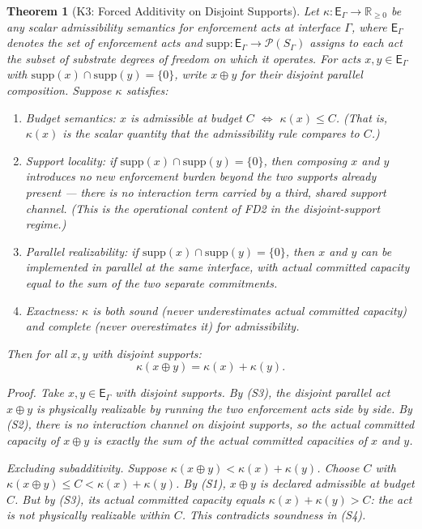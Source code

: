 \documentclass[11pt,a4paper]{article}
\newtheorem{theorem}{Theorem}[section]
\theoremstyle{definition}
\begin{document}
\begin{theorem}[K3: Forced Additivity on Disjoint Supports]\label{thm:K3}
Let $\kappa: \mathsf{E}_\Gamma \to \mathbb{R}_{\ge 0}$ be any scalar admissibility semantics for enforcement acts at interface $\Gamma$, where $\mathsf{E}_\Gamma$ denotes the set of enforcement acts and $\mathrm{supp}: \mathsf{E}_\Gamma \to \mathcal{P}(S_\Gamma)$ assigns to each act the subset of substrate degrees of freedom on which it operates.  For acts $x, y \in \mathsf{E}_\Gamma$ with $\mathrm{supp}(x) \cap \mathrm{supp}(y) = \{0\}$, write $x \oplus y$ for their disjoint parallel composition.  Suppose $\kappa$ satisfies:

\begin{enumerate}[nosep,leftmargin=2em,label=(S\arabic*)]
\item \textit{Budget semantics:} $x$ is admissible at budget $C$ $\iff$ $\kappa(x) \le C$.  (That is, $\kappa(x)$ is the scalar quantity that the admissibility rule compares to $C$.)
\item \textit{Support locality:} if $\mathrm{supp}(x) \cap \mathrm{supp}(y) = \{0\}$, then composing $x$ and $y$ introduces no new enforcement burden beyond the two supports already present --- there is no interaction term carried by a third, shared support channel.  (This is the operational content of FD2 in the disjoint-support regime.)
\item \textit{Parallel realizability:} if $\mathrm{supp}(x) \cap \mathrm{supp}(y) = \{0\}$, then $x$ and $y$ can be implemented in parallel at the same interface, with actual committed capacity equal to the sum of the two separate commitments.
\item \textit{Exactness:} $\kappa$ is both sound (never underestimates actual committed capacity) and complete (never overestimates it) for admissibility.
\end{enumerate}

Then for all $x, y$ with disjoint supports:
\[
\kappa(x \oplus y) = \kappa(x) + \kappa(y).
\]

\smallskip\noindent\textit{Proof.}
Take $x, y \in \mathsf{E}_\Gamma$ with disjoint supports.  By (S3), the disjoint parallel act $x \oplus y$ is physically realizable by running the two enforcement acts side by side.  By (S2), there is no interaction channel on disjoint supports, so the actual committed capacity of $x \oplus y$ is exactly the sum of the actual committed capacities of $x$ and $y$.

\textit{Excluding subadditivity.}  Suppose $\kappa(x \oplus y) < \kappa(x) + \kappa(y)$.  Choose $C$ with $\kappa(x \oplus y) \le C < \kappa(x) + \kappa(y)$.  By (S1), $x \oplus y$ is declared admissible at budget $C$.  But by (S3), its actual committed capacity equals $\kappa(x) + \kappa(y) > C$: the act is not physically realizable within $C$.  This contradicts soundness in (S4).


\end{theorem}
\end{document}
